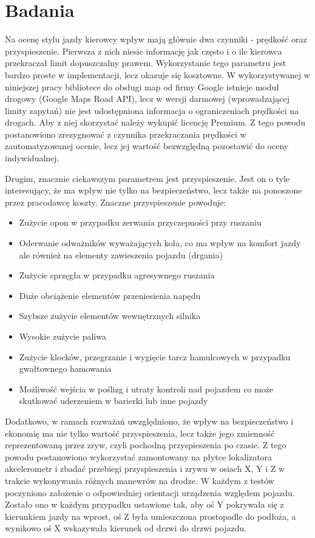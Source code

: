 \clearpage
\section{Badania}
\label{experiments}

Na ocenę stylu jazdy kierowcy wpływ mają głównie dwa czynniki - prędkość oraz przyspieszenie. Pierwsza z nich niesie informację jak często i o ile kierowca przekraczał limit dopuszczalny prawem. Wykorzystanie tego parametru jest bardzo proste w implementacji, lecz okazuje się kosztowne. W wykorzystywanej w niniejszej pracy bibliotece do obsługi map od firmy Google istnieje moduł drogowy (Google Maps Road API\cite{google_map_road_api}), lecz w wersji darmowej (wprowadzającej limity zapytań) nie jest udostępniona informacja o ograniczeniach prędkości na drogach. Aby z niej skorzystać należy wykupić licencję Premium. Z tego powodu postanowiono zrezygnować z czynnika przekraczania prędkości w zautomatyzowanej ocenie, lecz jej wartość bezwzględną pozostawić do oceny indywidualnej.

Drugim, znacznie ciekawszym parametrem jest przyspieszenie. Jest on o tyle interesujący, że ma wpływ nie tylko na bezpieczeństwo, lecz także na ponoszone przez pracodawcę koszty. Znaczne przyspieszenie powoduje:

\begin{itemize}
\item Zużycie opon w przypadku zerwania przyczepności przy ruszaniu
\item Oderwanie odważników wyważających koła, co ma wpływ na komfort jazdy ale również na elementy zawieszenia pojazdu (drgania)
\item Zużycie sprzęgła w przypadku agresywnego ruszania
\item Duże obciążenie elementów przeniesienia napędu
\item Szybsze zużycie elementów wewnętrznych silnika
\item Wysokie zużycie paliwa 
\item Zużycie klocków, przegrzanie i wygięcie tarcz hamulcowych w przypadku gwałtownego hamowania
\item Możliwość wejścia w poślizg i utraty kontroli nad pojazdem co może skutkować uderzeniem w barierki lub inne pojazdy
\end{itemize}

Dodatkowo, w ramach rozważań uwzględniono, że wpływ na bezpieczeństwo i ekonomię ma nie tylko wartość przyspieszenia, lecz także jego zmienność reprezentowaną przez zryw, czyli pochodną przyspieszenia po czasie. Z tego powodu postanowiono wykorzystać zamontowany na płytce lokalizatora akcelerometr i zbadać przebiegi przyspieszenia i zrywu w osiach X, Y i Z w trakcie wykonywania różnych manewrów na drodze. W każdym z testów poczyniono założenie o odpowiedniej orientacji urządzenia względem pojazdu. Zostało ono w każdym przypadku ustawione tak, aby oś Y pokrywała się z kierunkiem jazdy na wprost, oś Z była umieszczona prostopadle do podłoża, a wynikowo oś X wskazywała kierunek od drzwi do drzwi pojazdu.

